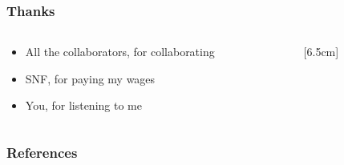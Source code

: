 \documentclass[aspectratio=169]{beamer}
\begin{document}
\begin{frame}
	\frametitle{Thanks}
	\begin{columns}
		\begin{column}{0.495\linewidth}
			\begin{itemize}
				\item All the collaborators, for collaborating
				\item SNF, for paying my wages
				\item<2-> You, for listening to me%
			\end{itemize}%
	\end{column}
	\begin{column}{0.495\linewidth}
		[6.5cm]
		\end{column}
	\end{columns}
\end{frame}

\begin{frame}
	\frametitle{References}
	\printbibliography
\end{frame}
\end{document}
